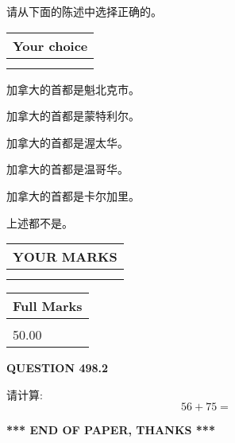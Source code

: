 \documentclass{ctexart}
\begin{document}
  
请从下面的陈述中选择正确的。
  
  
\noindent\hspace{3.0in} \begin{tabular}{|l|}
\hline
Your choice \\
\hline
 \\ 
 \\ 
\hline
\end{tabular}
  
  
 
 
加拿大的首都是魁北克市。
 
 
加拿大的首都是蒙特利尔。
 
 
加拿大的首都是渥太华。
 
 
加拿大的首都是温哥华。
 
 
加拿大的首都是卡尔加里。
 
 
 上述都不是。
 
 
  
\vspace{0.2in}
  
\noindent\begin{tabular}{|l|}
\hline
 YOUR MARKS  \\
\hline
 \\ 
 \\ 
\hline
\end{tabular}
\hspace{0.05in} \begin{tabular}{|l|}
\hline
 Full Marks  \\
\hline
 \\ 
50.00 \\
\hline
\end{tabular}
{\textbf{\Large{QUESTION
498.2 
}}}
  
  
 
请计算:
\begin{equation}
56 +  %
75 = \nonumber
\end{equation}
 

 

 
   
   
 \vspace{0.2in}
 
   
   
   
   
\vspace{1.0in} 
{\textbf{\large{ *** END OF PAPER, THANKS *** }}} 
   
\end{document}

